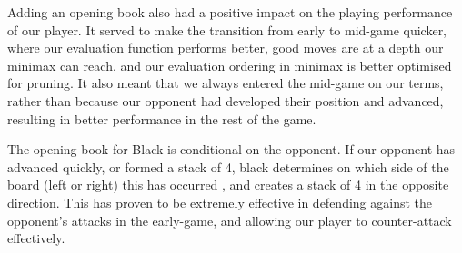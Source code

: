 \documentclass[11pt]{article}
\begin{document}
Adding an opening book also had a positive impact on the playing performance of our player. It served to make the transition from early to mid-game quicker, where our evaluation function performs better, good moves are at a depth our minimax can reach, and our evaluation ordering in minimax is better optimised for pruning. It also meant that we always entered the mid-game on our terms, rather than because our opponent had developed their position and advanced, resulting in better performance in the rest of the game. 

The opening book for Black is conditional on the opponent. If our opponent has advanced quickly, or formed a stack of 4, black determines on which side of the board (left or right) this has occurred , and creates a stack of 4 in the opposite direction. This has proven to be extremely effective in defending against the opponent's attacks in the early-game, and allowing our player to counter-attack effectively.

\printbibliography
\end{document}
